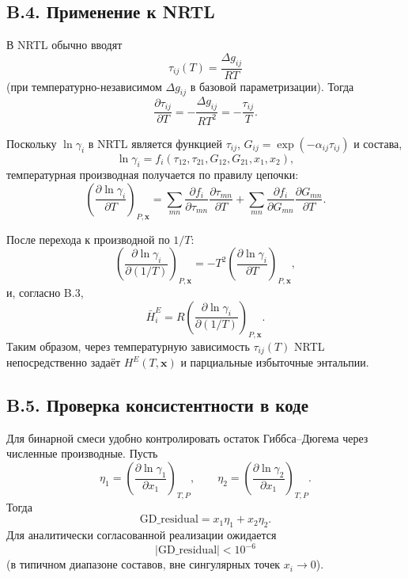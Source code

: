 \documentclass[11pt]{article}
\begin{document}
\subsection*{B.4. Применение к NRTL}

В NRTL обычно вводят
\begin{equation*}
\tau_{ij}(T)=\frac{\Delta g_{ij}}{RT}
\end{equation*}
(при температурно-независимом $\Delta g_{ij}$ в базовой параметризации). Тогда
\begin{equation*}
\frac{\partial \tau_{ij}}{\partial T}=-\frac{\Delta g_{ij}}{RT^2}=-\frac{\tau_{ij}}{T}.
\end{equation*}

Поскольку $\ln\gamma_i$ в NRTL является функцией $\tau_{ij}$, $G_{ij}=\exp(-\alpha_{ij}\tau_{ij})$ и состава,
\begin{equation*}
\ln\gamma_i = f_i(\tau_{12},\tau_{21},G_{12},G_{21},x_1,x_2),
\end{equation*}
температурная производная получается по правилу цепочки:
\begin{equation*}
\left(\frac{\partial\ln\gamma_i}{\partial T}\right)_{P,\mathbf{x}}
=
\sum_{mn}\frac{\partial f_i}{\partial \tau_{mn}}\frac{\partial \tau_{mn}}{\partial T}
+
\sum_{mn}\frac{\partial f_i}{\partial G_{mn}}\frac{\partial G_{mn}}{\partial T}.
\end{equation*}

После перехода к производной по $1/T$:
\begin{equation*}
\left(\frac{\partial\ln\gamma_i}{\partial (1/T)}\right)_{P,\mathbf{x}}
=
-T^2\left(\frac{\partial\ln\gamma_i}{\partial T}\right)_{P,\mathbf{x}},
\end{equation*}
и, согласно B.3,
\begin{equation*}
\bar H_i^E = R\left(\frac{\partial\ln\gamma_i}{\partial (1/T)}\right)_{P,\mathbf{x}}.
\end{equation*}
Таким образом, через температурную зависимость $\tau_{ij}(T)$ NRTL непосредственно задаёт $H^E(T,\mathbf{x})$ и парциальные избыточные энтальпии.

\subsection*{B.5. Проверка консистентности в коде}

Для бинарной смеси удобно контролировать остаток Гиббса--Дюгема через численные производные.
Пусть
\begin{equation*}
\eta_1 = \left(\frac{\partial\ln\gamma_1}{\partial x_1}\right)_{T,P},
\qquad
\eta_2 = \left(\frac{\partial\ln\gamma_2}{\partial x_1}\right)_{T,P}.
\end{equation*}
Тогда
\begin{equation*}
\mathrm{GD\_residual} = x_1\eta_1 + x_2\eta_2.
\end{equation*}
Для аналитически согласованной реализации ожидается
\begin{equation*}
|\mathrm{GD\_residual}| < 10^{-6}
\end{equation*}
(в типичном диапазоне составов, вне сингулярных точек $x_i\to0$).
\end{document}
